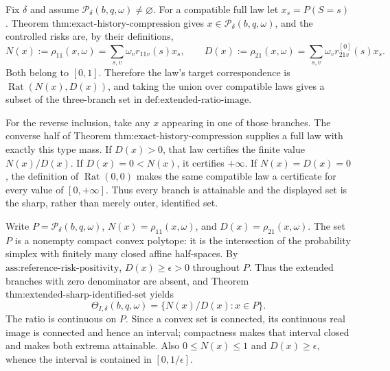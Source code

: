 Fix \(\delta\) and assume \(\mathcal P_\delta(b,q,\omega)\ne\varnothing\).  For a compatible full law let \(x_s=P(S=s)\).  Theorem \(\text{thm:exact-history-compression}\) gives \(x\in\mathcal P_\delta(b,q,\omega)\), and the controlled risks are, by their definitions,
\[
N(x):=\rho_{11}(x,\omega)=\sum_{s,v}\omega_vr_{11v}(s)x_s,
\qquad
D(x):=\rho_{21}(x,\omega)=\sum_{s,v}\omega_vr^{[0]}_{21v}(s)x_s.
\]
Both belong to \([0,1]\).  Therefore the law's target correspondence is \(\operatorname{Rat}(N(x),D(x))\), and taking the union over compatible laws gives a subset of the three-branch set in \(\text{def:extended-ratio-image}\).

For the reverse inclusion, take any \(x\) appearing in one of those branches.  The converse half of Theorem \(\text{thm:exact-history-compression}\) supplies a full law with exactly this type mass.  If \(D(x)>0\), that law certifies the finite value \(N(x)/D(x)\).  If \(D(x)=0<N(x)\), it certifies \(+\infty\).  If \(N(x)=D(x)=0\), the definition of \(\operatorname{Rat}(0,0)\) makes the same compatible law a certificate for every value of \([0,+\infty]\).  Thus every branch is attainable and the displayed set is the sharp, rather than merely outer, identified set.

Write \(P=\mathcal P_\delta(b,q,\omega)\), \(N(x)=\rho_{11}(x,\omega)\), and \(D(x)=\rho_{21}(x,\omega)\).  The set \(P\) is a nonempty compact convex polytope: it is the intersection of the probability simplex with finitely many closed affine half-spaces.  By \(\text{ass:reference-risk-positivity}\), \(D(x)\geq\epsilon>0\) throughout \(P\).  Thus the extended branches with zero denominator are absent, and Theorem \(\text{thm:extended-sharp-identified-set}\) yields
\[
\Theta_{I,\delta}(b,q,\omega)=\{N(x)/D(x):x\in P\}.
\]
The ratio is continuous on \(P\).  Since a convex set is connected, its continuous real image is connected and hence an interval; compactness makes that interval closed and makes both extrema attainable.  Also \(0\leq N(x)\leq1\) and \(D(x)\geq\epsilon\), whence the interval is contained in \([0,1/\epsilon]\).

